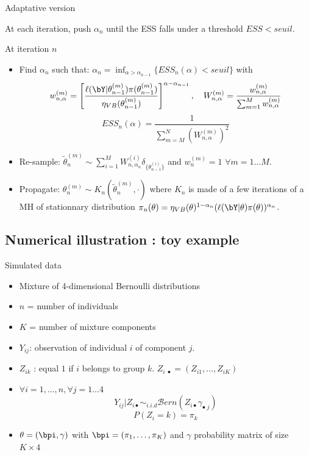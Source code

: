 \begin{frame}{Adaptative version}

At each iteration, push $\alpha_n$ until the ESS falls under a threshold  $ESS<seuil$. 

\begin{block}{At iteration $n$}
\begin{itemize}
\item Find  $\alpha_n$ such that: $\alpha_n = \inf_{\alpha > \alpha_{n-1}} \{ ESS_n(\alpha)<seuil\} $
with 
{\scriptsize $$w^{(m)}_{n,\alpha} =  \left[\frac{\ell(\bY | \theta^{(m)}_{n-1}) \pi(\theta^{(m)}_{n-1})}{\eta_{VB}(\theta^{(m)}_{n-1})} \right]^{\alpha-\alpha_{n-1}}, \quad W_{n,\alpha}^{(m)} =\frac{w^{(m)}_{n,\alpha}}{\sum_{m=1}^M w^{(m)}_{n,\alpha}}$$ 
$$  ESS_n(\alpha) = \frac{1}{ \sum_{m=M}^N \left(W_{n,\alpha}^{(m)}\right)^2 } $$}
\item \vert Re-sample: \noir$\widetilde{\theta}_{n}^{(m)} \sim \sum_{i=1}^M W_{n,\alpha_n}^{(i)}\delta_{\{\theta_{n-1}^{(i)}\}}$ and $w_n^{(m)}=1$  $\forall m=1\dots M$. 
\item \vert Propagate: \noir $\theta^{(m)}_n \sim K_n(\widetilde{\theta}_{n}^{(m)}, \cdot)$ where $K_n$ is made of a few iterations of a MH of stationnary distribution  $\pi_n(\theta)= \eta_{VB}(\theta)^{1- \alpha_n} (\ell(\bY | \theta) \pi(\theta))^{\alpha_n}$. 
 
\end{itemize}
\end{block}
\end{frame}






\subsection[Illustration]{Numerical illustration : toy example}

\begin{frame}{Simulated data}
\begin{itemize}
\item Mixture of 4-dimensional Bernoulli distributions
\item $n$ = number of individuals
\item $K$ = number of mixture components
\item $Y_{ij}$: observation of individual  $i$ of component $j$. 
\item $Z_{ik}$ : equal $1$ if $i$ belongs to  group  $k$. $Z_{i\;\bullet}=(Z_{i1},\dots,Z_{iK})$
\item $\forall i=1,\dots,n, \forall j=1\dots 4$ 
$$Y_{ij}| Z_{i\bullet} \sim_{i.i.d} \mathcal{B}ern(Z_{i\bullet} \gamma_{\bullet\; j})$$
$$P(Z_i=k) = \pi_k$$ 
\item $\theta=(\bpi , \gamma)$ with $\bpi = (\pi_1,\dots,\pi_K)$ and  $\gamma$ probability matrix of size  $K\times 4$
\end{itemize}
\end{frame}


